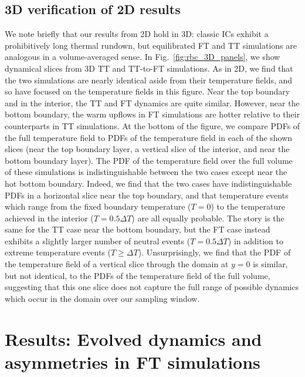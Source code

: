 \documentclass[aps, pre, onecolumn, nofootinbib, notitlepage, groupedaddress, amsfonts, amssymb, amsmath, longbibliography, superscriptaddress]{revtex4-1}
\newcommand{\ea}[1]{{\color{red} #1}}
\begin{document}
\ea{
\subsection{3D verification of 2D results}
We note briefly that our results from 2D hold in 3D: classic ICs exhibit a prohibitively long thermal rundown, but equilibrated FT and TT simulations are analogous in a volume-averaged sense.
In Fig.~\ref{fig:rbc_3D_panels}, we show dynamical slices from 3D TT and TT-to-FT simulations.
As in 2D, we find that the two simulations are nearly identical aside from their temperature fields, and so have focused on the temperature fields in this figure.
Near the top boundary and in the interior, the TT and FT dynamics are quite similar.
However, near the bottom boundary, the warm upflows in FT simulations are hotter relative to their counterparts in TT simulations.
At the bottom of the figure, we compare PDFs of the full temperature field to PDFs of the temperature field in each of the shown slices (near the top boundary layer, a vertical slice of the interior, and near the bottom boundary layer).
The PDF of the temperature field over the full volume of these simulations is indistinguishable between the two cases except near the hot bottom boundary.
Indeed, we find that the two cases have indistinguishable PDFs in a horizontal slice near the top boundary, and that temperature events which range from the fixed boundary temperature ($T = 0$) to the temperature achieved in the interior ($T = 0.5\Delta T$) are all equally probable.
The story is the same for the TT case near the bottom boundary, but the FT case instead exhibits a slightly larger number of neutral events ($T = 0.5\Delta T$) in addition to extreme temperature events ($T \geq \Delta T$).
Unsurprisingly, we find that the PDF of the temperature field of a vertical slice through the domain at $y = 0$ is similar, but not identical, to the PDFs of the temperature field of the full volume, suggesting that this one slice does not capture the full range of possible dynamics which occur in the domain over our sampling window.
}

\FloatBarrier



\section{Results: Evolved dynamics and asymmetries in FT simulations}
\label{sec:results_dynamics}
\end{document}
